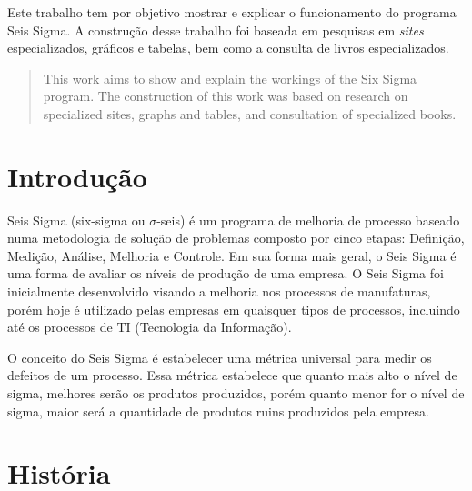\documentclass{abnt}
\begin{document}
	\capa
	
	\folhaderosto
	
	\begin{resumo}
		Este trabalho tem por objetivo mostrar e explicar o funcionamento do programa Seis Sigma. A construção 
		desse trabalho foi baseada em pesquisas em \textit{sites} especializados, gráficos e tabelas, bem como a consulta 
		de livros especializados.
	\end{resumo}

	\begin{abstract}
			This work aims to show and explain the workings of the Six Sigma program. The construction of this work 
			was based on research on specialized sites, graphs and tables, and consultation of specialized books.
	\end{abstract}
	
	\sumario
	
	\listadetabelas
	
	\listadefiguras
	
	\chapter {Introdução}
	
	Seis Sigma (six-sigma ou $\sigma$-seis) é um programa de melhoria de processo baseado numa 
	metodologia de solução de problemas composto por cinco etapas: Definição, Medição, Análise, 
	Melhoria e Controle. Em sua forma mais geral, o Seis Sigma é uma forma de avaliar os níveis 
	de produção de uma empresa. O Seis Sigma foi inicialmente desenvolvido visando a melhoria nos 
	processos de manufaturas, porém hoje é utilizado pelas empresas em quaisquer tipos de processos, 
	incluindo até os processos de TI (Tecnologia da Informação).
	
	O conceito do Seis Sigma é estabelecer uma métrica universal para medir os defeitos de um processo. 
	Essa métrica estabelece que quanto mais alto o nível de sigma, melhores serão os produtos produzidos, 
	porém quanto menor for o nível de sigma, maior será a quantidade de produtos ruins produzidos pela empresa.
	
	\chapter {História}
	
\end{document}
